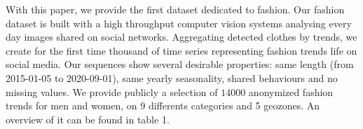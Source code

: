 \documentclass{article} %
\newcommand{\numberts}{14000}
\begin{document}
With this paper, we provide the first dataset dedicated to fashion. Our fashion dataset is built with a high throughput computer vision systems analysing every day images shared on social networks. Aggregating detected clothes by trends, we create for the first time thousand of time series representing fashion trends life on social media. Our sequences show several desirable properties: same length (from 2015-01-05 to 2020-09-01), same yearly seasonality, shared behaviours and no missing values. We provide publicly a selection of $\numberts$ anonymized fashion trends for men and women, on 9 differents categories and 5 geozones. An overview of it can be found in table 1.



\end{document}
